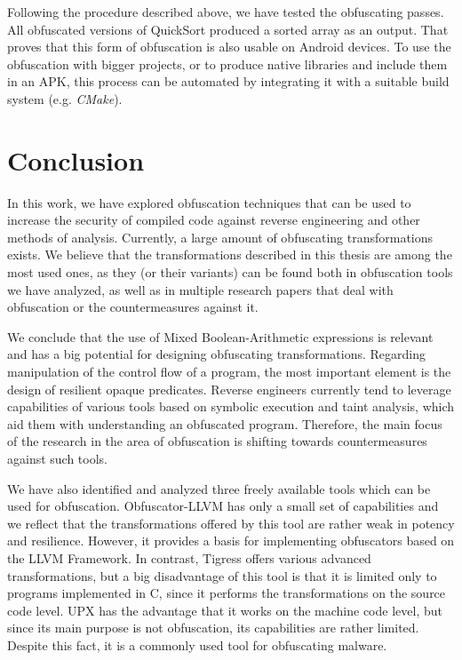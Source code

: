 \documentclass[
  digital, %
  notable,   %
  twoside, %
  nolof,     %
  nolot,     %
]{fithesis3}
\theoremstyle{definition}
\begin{document}
Following the procedure described above, we have tested the obfuscating passes. All obfuscated versions of QuickSort produced a sorted array as an output. That proves that this form of obfuscation is also usable on Android devices. To use the obfuscation with bigger projects, or to produce native libraries and include them in an APK, this process can be automated by integrating it with a suitable build system (e.g. \textit{CMake}). 

\chapter{Conclusion} \label{chap:conclusion}
In this work, we have explored obfuscation techniques that can be used to increase the security of compiled code against reverse engineering and other methods of analysis. Currently, a large amount of obfuscating transformations exists. We believe that the transformations described in this thesis are among the most used ones, as they (or their variants) can be found both in obfuscation tools we have analyzed, as well as in multiple research papers that deal with obfuscation or the countermeasures against it. 

We conclude that the use of Mixed Boolean-Arithmetic expressions is relevant and has a big potential for designing obfuscating transformations. Regarding manipulation of the control flow of a program, the most important element is the design of resilient opaque predicates. Reverse engineers currently tend to leverage capabilities of various tools based on symbolic execution and taint analysis, which aid them with understanding an obfuscated program. Therefore, the main focus of the research in the area of obfuscation is shifting towards countermeasures against such tools. 

We have also identified and analyzed three freely available tools which can be used for obfuscation. Obfuscator-LLVM has only a small set of capabilities and we reflect that the transformations offered by this tool are rather weak in potency and resilience. However, it provides a basis for implementing obfuscators based on the LLVM Framework. In contrast, Tigress offers various advanced transformations, but a big disadvantage of this tool is that it is limited only to programs implemented in C, since it performs the transformations on the source code level. UPX has the advantage that it works on the machine code level, but since its main purpose is not obfuscation, its capabilities are rather limited. Despite this fact, it is a commonly used tool for obfuscating malware. 
\end{document}
